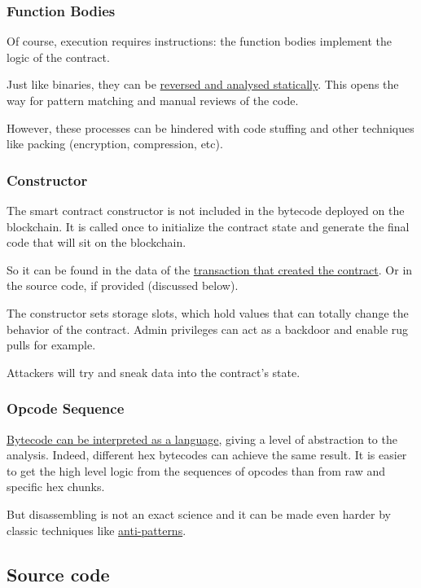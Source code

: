 \subsubsection{Function Bodies}

Of course, execution requires instructions: the function bodies implement the logic of the contract.

Just like binaries, they can be \href{\urlarticlereversingcontract}{reversed and analysed statically}.
This opens the way for pattern matching and manual reviews of the code.

However, these processes can be hindered with code stuffing and other techniques like packing (encryption, compression, etc).

\subsubsection{Constructor}

The smart contract constructor is not included in the bytecode deployed on the blockchain.
It is called once to initialize the contract state and generate the final code that will sit on the blockchain.

So it can be found in the data of the \href{https://etherscan.io/tx/0xd66169d4a5feaceaf777b9949ad0e9bc5621a438846a90087e50a5d7b9b0ad1e}{transaction that created the contract}.
Or in the source code, if provided (discussed below).

The constructor sets storage slots, which hold values that can totally change the behavior of the contract.
Admin privileges can act as a backdoor and enable rug pulls for example.

Attackers will try and sneak data into the contract's state.

\subsubsection{Opcode Sequence}

\href{\urlcodeevmdasm}{Bytecode can be interpreted as a language}, giving a level of abstraction to the analysis.
Indeed, different hex bytecodes can achieve the same result.
It is easier to get the high level logic from the sequences of opcodes than from raw and specific hex chunks.

But disassembling is not an exact science and it can be made even harder by classic techniques like \href{\urlpapereshield}{anti-patterns}.

\subsection{Source code}

